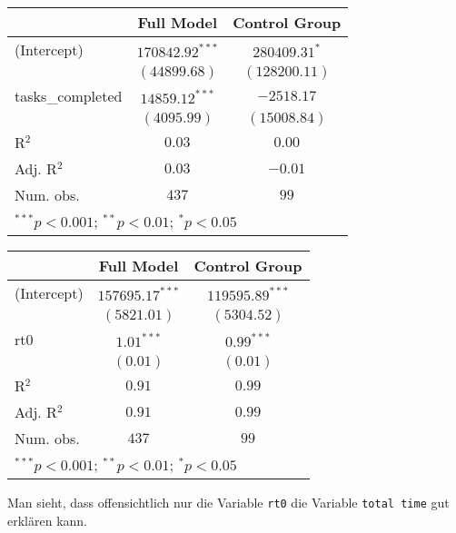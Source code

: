 \documentclass{article}
\begin{document}
\begin{center}
\begin{tabular}{l c c}
\hline
 & Full Model & Control Group \\
\hline
(Intercept)      & $170842.92^{***}$ & $280409.31^{*}$ \\
                 & $(44899.68)$      & $(128200.11)$   \\
tasks\_completed & $14859.12^{***}$  & $-2518.17$      \\
                 & $(4095.99)$       & $(15008.84)$    \\
\hline
R$^2$            & $0.03$            & $0.00$          \\
Adj. R$^2$       & $0.03$            & $-0.01$         \\
Num. obs.        & $437$             & $99$            \\
\hline
\multicolumn{3}{l}{\scriptsize{$^{***}p<0.001$; $^{**}p<0.01$; $^{*}p<0.05$}}
\end{tabular}
\end{center}
\begin{center}
\begin{tabular}{l c c}
\hline
 & Full Model & Control Group \\
\hline
(Intercept) & $157695.17^{***}$ & $119595.89^{***}$ \\
            & $(5821.01)$       & $(5304.52)$       \\
rt0         & $1.01^{***}$      & $0.99^{***}$      \\
            & $(0.01)$          & $(0.01)$          \\
\hline
R$^2$       & $0.91$            & $0.99$            \\
Adj. R$^2$  & $0.91$            & $0.99$            \\
Num. obs.   & $437$             & $99$              \\
\hline
\multicolumn{3}{l}{\scriptsize{$^{***}p<0.001$; $^{**}p<0.01$; $^{*}p<0.05$}}
\end{tabular}
\end{center}
Man sieht, dass offensichtlich nur die Variable \texttt{rt0} die Variable \texttt{total time} gut erklären kann.
\end{document}
